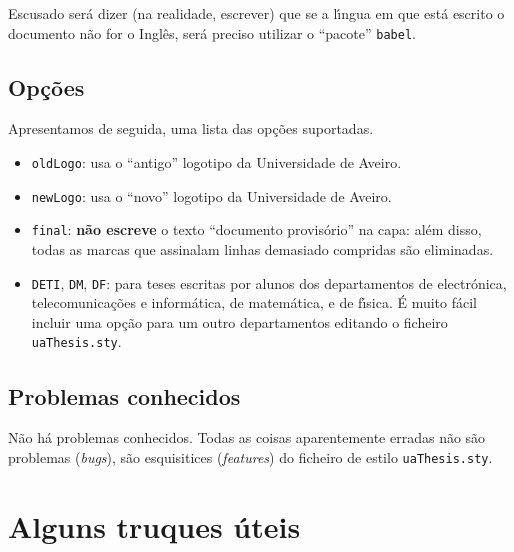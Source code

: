 \documentclass[11pt,twoside,a4paper]{report}
\begin{document}
Escusado ser\'a dizer (na realidade, escrever) que se a l\'\i ngua em que est\'a escrito o
documento n\~ao for o Ingl\^es, ser\'a preciso utilizar o ``pacote'' \verb.babel..


\section{Op\c c\~oes}

Apresentamos de seguida, uma lista das op\c c\~oes suportadas.
\begin{itemize}
  \item \verb+oldLogo+: usa o ``antigo'' logotipo da Universidade de Aveiro.
  \item \verb+newLogo+: usa o ``novo'' logotipo da Universidade de Aveiro.
  \item \verb+final+: \textbf{n\~ao escreve} o texto ``documento provis\'orio'' na capa: al\'em
        disso, todas as marcas que assinalam linhas demasiado compridas s\~ao eliminadas.
  \item \verb+DETI+, \verb+DM+, \verb+DF+: para teses escritas por alunos dos departamentos de
        electr\'onica, telecomunica\c c\~oes e inform\'atica, de matem\'atica, e de f\'\i sica.
        \'E muito f\'acil incluir uma op\c c\~ao para um outro departamentos editando o
        ficheiro \verb+uaThesis.sty+.
\end{itemize}


\section{Problemas conhecidos}

N\~ao h\'a problemas conhecidos. Todas as coisas aparentemente erradas n\~ao s\~ao problemas
(\textit{bugs}), s\~ao esquisitices (\textit{features}) do ficheiro de estilo \verb:uaThesis.sty:.


\cleardoublepage
\chapter{Alguns truques \'uteis}
\end{document}
